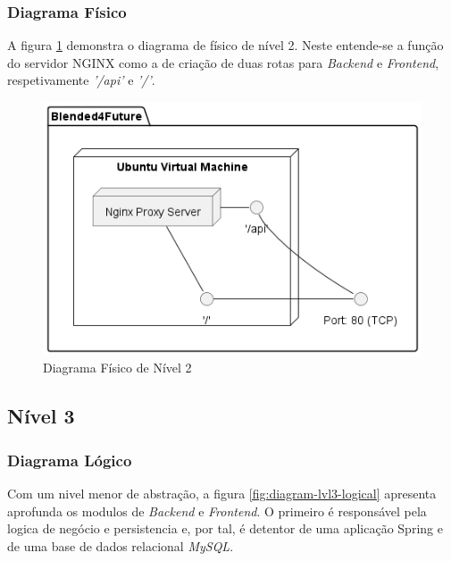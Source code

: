 \subsubsection{Diagrama Físico} 

A figura \ref{fig:diagram-lvl2-physical} demonstra o diagrama de físico de nível 2. Neste entende-se a função do servidor \gls{NGINX} como a de criação de duas rotas para \textit{Backend} e \textit{Frontend}, respetivamente \textit{'/api'} e \textit{'/'}.

\begin{figure}[h!tbp]
    \centering
    \includegraphics[width=0.6\linewidth]{capitulos/cap3-analisedoproblema/assets/arquiteturasistema/physical/physical_l2.png}
    \caption{Diagrama Físico de Nível 2}
    \label{fig:diagram-lvl2-physical}
\end{figure}




\subsection{Nível 3}

\subsubsection{Diagrama Lógico}

Com um nivel menor de abstração, a figura \ref{fig:diagram-lvl3-logical} apresenta aprofunda os modulos de \textit{Backend} e \textit{Frontend}. O primeiro é responsável pela logica de negócio e persistencia e, por tal, é detentor de uma aplicação Spring e de uma base de dados relacional \textit{MySQL}.

